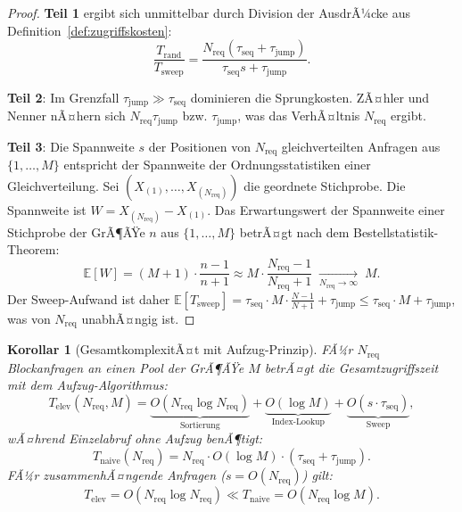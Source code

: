﻿\documentclass[a4paper,12pt]{article}
\theoremstyle{definition}
\theoremstyle{plain}
\newtheorem{korollar}{Korollar}[section]
\begin{document}
\begin{proof}
  \textbf{Teil 1} ergibt sich unmittelbar durch Division der AusdrÃ¼cke
  aus Definition~\ref{def:zugriffskosten}:
  \[
    \frac{T_{\mathrm{rand}}}{T_{\mathrm{sweep}}}
    = \frac{N_{\mathrm{req}} (\tau_{\mathrm{seq}} + \tau_{\mathrm{jump}})}
           {\tau_{\mathrm{seq}} s + \tau_{\mathrm{jump}}}.
  \]

  \textbf{Teil 2}: Im Grenzfall $\tau_{\mathrm{jump}} \gg \tau_{\mathrm{seq}}$
  dominieren die Sprungkosten.  ZÃ¤hler und Nenner nÃ¤hern sich
  $N_{\mathrm{req}} \tau_{\mathrm{jump}}$ bzw. $\tau_{\mathrm{jump}}$,
  was das VerhÃ¤ltnis $N_{\mathrm{req}}$ ergibt.

  \textbf{Teil 3}: Die Spannweite $s$ der Positionen von
  $N_{\mathrm{req}}$ gleichverteilten Anfragen aus $\{1,\ldots,M\}$
  entspricht der Spannweite der Ordnungsstatistiken einer
  Gleichverteilung.  Sei $(X_{(1)}, \ldots, X_{(N_{\mathrm{req}})})$ die
  geordnete Stichprobe.  Die Spannweite ist
  $W = X_{(N_{\mathrm{req}})} - X_{(1)}$.  Das Erwartungswert der
  Spannweite einer Stichprobe der GrÃ¶ÃŸe $n$ aus $\{1,\ldots,M\}$ betrÃ¤gt
  nach dem Bestellstatistik-Theorem:
  \[
    \mathbb{E}[W]
    = (M+1)\cdot\frac{n-1}{n+1}
    \approx M \cdot \frac{N_{\mathrm{req}}-1}{N_{\mathrm{req}}+1}
    \;\underset{N_{\mathrm{req}}\to\infty}{\longrightarrow}\; M.
  \]
  Der Sweep-Aufwand ist daher
  $\mathbb{E}[T_{\mathrm{sweep}}]
     = \tau_{\mathrm{seq}} \cdot M \cdot \frac{N-1}{N+1} + \tau_{\mathrm{jump}}
     \le \tau_{\mathrm{seq}} \cdot M + \tau_{\mathrm{jump}}$,
  was von $N_{\mathrm{req}}$ unabhÃ¤ngig ist. 
\end{proof}

\begin{korollar}[GesamtkomplexitÃ¤t mit Aufzug-Prinzip]
\label{kor:elevator_total}
  FÃ¼r $N_{\mathrm{req}}$ Blockanfragen an einen Pool der GrÃ¶ÃŸe $M$ betrÃ¤gt
  die Gesamtzugriffszeit mit dem Aufzug-Algorithmus:
  \[
    T_{\mathrm{elev}}(N_{\mathrm{req}}, M)
    = \underbrace{O(N_{\mathrm{req}} \log N_{\mathrm{req}})}_{\text{Sortierung}}
    + \underbrace{O(\log M)}_{\text{Index-Lookup}}
    + \underbrace{O(s \cdot \tau_{\mathrm{seq}})}_{\text{Sweep}},
  \]
  wÃ¤hrend Einzelabruf ohne Aufzug benÃ¶tigt:
  \[
    T_{\mathrm{naive}}(N_{\mathrm{req}})
    = N_{\mathrm{req}} \cdot O(\log M) \cdot (\tau_{\mathrm{seq}} + \tau_{\mathrm{jump}}).
  \]
  FÃ¼r zusammenhÃ¤ngende Anfragen ($s = O(N_{\mathrm{req}})$) gilt:
  \[
    T_{\mathrm{elev}} = O(N_{\mathrm{req}} \log N_{\mathrm{req}})
    \ll T_{\mathrm{naive}} = O(N_{\mathrm{req}} \log M).
  \]
\end{korollar}
\end{document}
